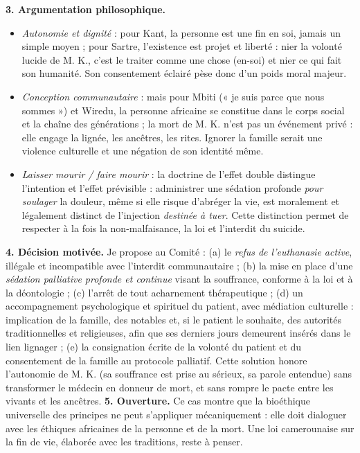 \documentclass[11pt]{article}
\begin{document}
\begin{corrige}
\textbf{3. Argumentation philosophique.}
\begin{itemize}
\item \emph{Autonomie et dignité} : pour Kant, la personne est une fin en soi, jamais un simple moyen ; pour Sartre, l'existence est projet et liberté : nier la volonté lucide de M. K., c'est le traiter comme une chose (en-soi) et nier ce qui fait son humanité. Son consentement éclairé pèse donc d'un poids moral majeur.
\item \emph{Conception communautaire} : mais pour Mbiti (« je suis parce que nous sommes ») et Wiredu, la personne africaine se constitue dans le corps social et la chaîne des générations ; la mort de M. K. n'est pas un événement privé : elle engage la lignée, les ancêtres, les rites. Ignorer la famille serait une violence culturelle et une négation de son identité même.
\item \emph{Laisser mourir / faire mourir} : la doctrine de l'effet double distingue l'intention et l'effet prévisible : administrer une sédation profonde \emph{pour soulager} la douleur, même si elle risque d'abréger la vie, est moralement et légalement distinct de l'injection \emph{destinée à tuer}. Cette distinction permet de respecter à la fois la non-malfaisance, la loi et l'interdit du suicide.
\end{itemize}
\textbf{4. Décision motivée.} Je propose au Comité : (a) le \emph{refus de l'euthanasie active}, illégale et incompatible avec l'interdit communautaire ; (b) la mise en place d'une \emph{sédation palliative profonde et continue} visant la souffrance, conforme à la loi et à la déontologie ; (c) l'arrêt de tout acharnement thérapeutique ; (d) un accompagnement psychologique et spirituel du patient, avec médiation culturelle : implication de la famille, des notables et, si le patient le souhaite, des autorités traditionnelles et religieuses, afin que ses derniers jours demeurent insérés dans le lien lignager ; (e) la consignation écrite de la volonté du patient et du consentement de la famille au protocole palliatif. Cette solution honore l'autonomie de M. K. (sa souffrance est prise au sérieux, sa parole entendue) sans transformer le médecin en donneur de mort, et sans rompre le pacte entre les vivants et les ancêtres.
\textbf{5. Ouverture.} Ce cas montre que la bioéthique universelle des principes ne peut s'appliquer mécaniquement : elle doit dialoguer avec les éthiques africaines de la personne et de la mort. Une loi camerounaise sur la fin de vie, élaborée avec les traditions, reste à penser.


\end{corrige}
\end{document}
